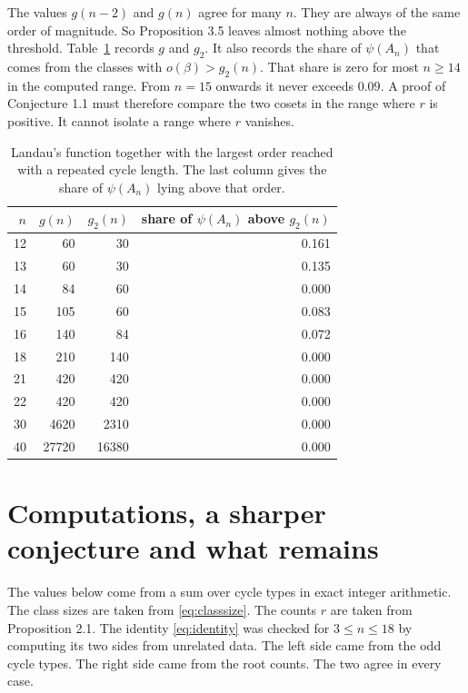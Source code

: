 \documentclass[10pt]{article}
\begin{document}
\medskip
The values $g(n-2)$ and $g(n)$ agree for many $n$. They are always of the same order of
magnitude. So Proposition 3.5 leaves almost nothing above the threshold.
Table~\ref{tab:landau} records $g$ and $g_2$. It also records the share of $\psi(A_n)$ that
comes from the classes with $o(\beta)>g_2(n)$. That share is zero for most $n\ge14$ in the
computed range. From $n=15$ onwards it never exceeds $0.09$. A proof of Conjecture 1.1 must
therefore compare the two cosets in the range where $r$ is positive. It cannot isolate a
range where $r$ vanishes.

\begin{table}[ht]
\centering
\begin{tabular}{@{}rrrr@{}}
\toprule
$n$ & $g(n)$ & $g_2(n)$ & share of $\psi(A_n)$ above $g_2(n)$\\
\midrule
12 & 60 & 30 & 0.161\\
13 & 60 & 30 & 0.135\\
14 & 84 & 60 & 0.000\\
15 & 105 & 60 & 0.083\\
16 & 140 & 84 & 0.072\\
18 & 210 & 140 & 0.000\\
21 & 420 & 420 & 0.000\\
22 & 420 & 420 & 0.000\\
30 & 4620 & 2310 & 0.000\\
40 & 27720 & 16380 & 0.000\\
\bottomrule
\end{tabular}
\caption{Landau's function together with the largest order reached with a repeated cycle
length. The last column gives the share of $\psi(A_n)$ lying above that order.}
\label{tab:landau}
\end{table}

\section{Computations, a sharper conjecture and what remains}\label{sec:data}

The values below come from a sum over cycle types in exact integer arithmetic. The class
sizes are taken from \eqref{eq:classsize}. The counts $r$ are taken from Proposition 2.1.
The identity \eqref{eq:identity} was checked for $3\le n\le18$ by computing its two sides
from unrelated data. The left side came from the odd cycle types. The right side came from
the root counts. The two agree in every case.
\end{document}
